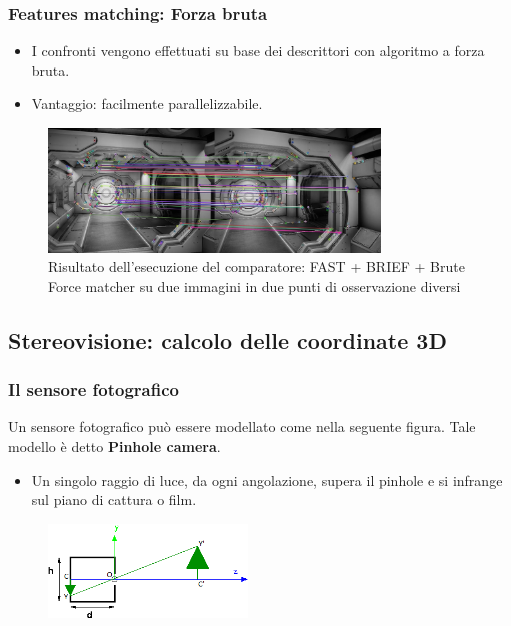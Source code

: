 \documentclass{beamer}
\begin{document}
\begin{frame}
\frametitle{Features matching: Forza bruta}
\begin{itemize}
	\item I confronti vengono effettuati su base dei descrittori con algoritmo a forza bruta.
	\item Vantaggio: facilmente parallelizzabile.
\end{itemize}
\begin{figure}[h!]
	\centering
	\includegraphics[width=250pt]{imgs/TwoInstantDetection.jpg}
	\caption{Risultato dell'esecuzione del comparatore: FAST + BRIEF + Brute Force matcher su due immagini in due punti di osservazione diversi}
	\label{vis:feature:risTwo}
\end{figure}
\end{frame}

\subsection{Stereovisione: calcolo delle coordinate 3D}

\begin{frame}
\frametitle{Il sensore fotografico}
Un sensore fotografico può essere modellato come nella seguente figura. Tale modello è detto \textbf{Pinhole camera}.
\begin{itemize}
	\item Un singolo raggio di luce, da ogni angolazione, supera il pinhole e si infrange sul piano di cattura o film.
\end{itemize}
\begin{figure}[h!]
	\centering
	\includegraphics[width=150pt]{imgs/pinhole-and-tree2.png}
	\label{vis:stereo:pinhole}
\end{figure} 
\end{frame}
\end{document}
